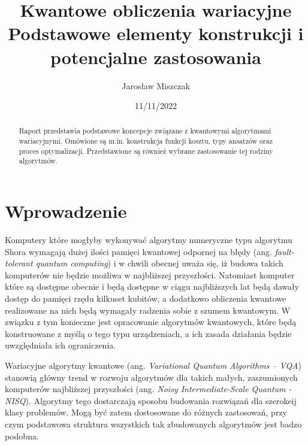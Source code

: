 \documentclass[a4paper,11pt]{article}
\newcommand{\ang}[1]{(ang. \emph{#1})}
\begin{document}
\title{Kwantowe obliczenia wariacyjne\\ {\normalsize Podstawowe elementy konstrukcji i potencjalne zastosowania}}

\author{Jarosław Miszczak}
\date{11/11/2022}

\maketitle

\begin{abstract}
Raport przedstawia podstawowe koncepcje związane z kwantowymi algorytmami wariacyjnymi. Omówione są m.in. konstrukcja funkcji kosztu, typy ansatzów oraz proces optymalizacji. Przedstawione są również wybrane zastosowanie tej rodziny algorytmów.
\end{abstract}


\hypertarget{wprowadzenie}{%
\section{Wprowadzenie}\label{wprowadzenie}}

 Komputery które mogłyby wykonywać algorytmy numeryczne typu algorytmu Shora wymagają dużej ilości pamięci kwantowej odpornej na błędy \ang{fault-tolerant quantum computing} i w chwili obecnej uważa się, iż budowa takich komputerów nie będzie możliwa w najbliższej przyszłości. Natomiast komputer które są dostępne obecnie i będą dostępne w ciągu najbliższych lat będą dawały dostęp do pamięci rzędu kilkuset kubitów, a dodatkowo obliczenia kwantowe realizowane na nich będą wymagały radzenia sobie z szumem kwantowym. W związku z tym konieczne jest opracowanie algorytmów kwantowych, które będą konstruowane z myślą o tego typu urządzeniach, a ich zasada działania będzie uwzględniała ich ograniczenia.
 
 Wariacyjne algorytmy kwantowe \ang{Variational Quantum Algorithms -- VQA} stanowią główny trend w rozwoju algorytmów dla takich małych, zaszumionych komputerów najbliższej przyszłości \ang{Noisy Intermediate-Scale Quantum - NISQ}. Algorytmy tego dostarczają sposobu budowania rozwiązań dla szerokeij klasy problemów. Mogą być zatem dostosowane do różnych zastosowań, przy czym podstawowa struktura wszystkich tak zbudowanych algorytmów jest badzo podobna.

\newpage 
\end{document}
